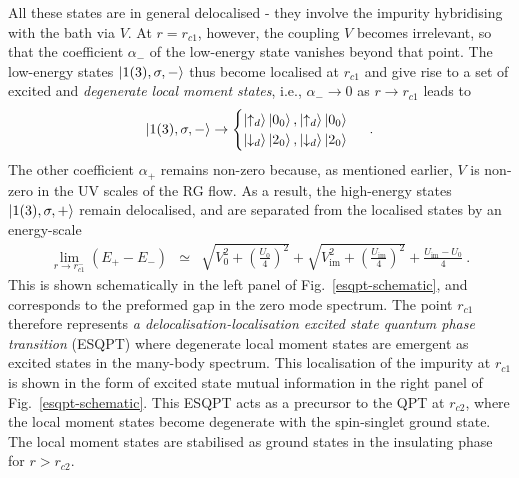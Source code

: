 \documentclass{iopart}
\begin{document}
All these states are in general delocalised - they involve the impurity hybridising with the bath via \(V\). At \(r = r_{c1}\), however, the coupling \(V\) becomes irrelevant, so that the coefficient \(\alpha_-\) of the low-energy state vanishes beyond that point. The low-energy states \(\ket{1(3),\sigma,-}\) thus become localised at \(r_{c1}\) and give rise to a set of excited and {\it degenerate local moment states}, i.e., $\alpha_- \to 0$ as $r \to r_{c1}$ leads to
\begin{eqnarray}
\ket{1(3),\sigma,-} \to \begin{cases}
	\ket{\uparrow_d}\ket{0_0}, \ket{\uparrow_d}\ket{0_0}\\
	\ket{\downarrow_d}\ket{2_0}, \ket{\downarrow_d}\ket{2_0}\\
\end{cases}~.
\end{eqnarray}
The other coefficient \(\alpha_+\) remains non-zero because, as mentioned earlier, \(V\) is non-zero in the UV scales of the RG flow. As a result, the high-energy states \(\ket{1(3),\sigma,+}\) remain delocalised, and are separated from the localised states by an energy-scale
\begin{eqnarray}
\lim_{r \to r_{c1}^-} \left(E_+ - E_-\right) &\simeq & \sqrt{V_0^2 + \left(\frac{U_0}{4}\right)^2} + \sqrt{V_{\text{im}}^2 + \left(\frac{U_{\text{im}}}{4}\right)^2} + \frac{U_{\text{im}}-U_0}{4}~.
\end{eqnarray}
This is shown schematically in the left panel of Fig.~\eqref{esqpt-schematic}, and corresponds to the preformed gap in the zero mode spectrum. The point \(r_{c1}\) therefore represents {\it a delocalisation-localisation excited state quantum phase transition} (ESQPT) where degenerate local moment states are emergent as excited states in the many-body spectrum. This localisation of the impurity at $r_{c1}$ is shown in the form of excited state mutual information in the right panel of Fig.~\eqref{esqpt-schematic}. This ESQPT acts as a precursor to the QPT at $r_{c2}$, where the local moment states become degenerate with the spin-singlet ground state. The local moment states are stabilised as ground states in the insulating phase for $r>r_{c2}$. 
\end{document}
